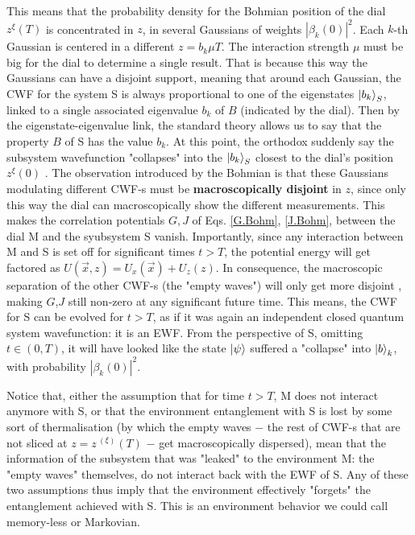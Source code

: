 \documentclass[11pt, a4paper]{article} %
\begin{document}
This means that the probability density for the Bohmian position of the dial $z^\xi(T)$ is concentrated in $z$, in several Gaussians of weights $|\beta_k(0)|^2$. Each $k$-th Gaussian is centered in a different $z=b_k \mu T$. The interaction strength $\mu$ must be big for the dial to determine a single result. That is because this way the Gaussians can have a disjoint support, meaning that around each Gaussian, the CWF for the system S is always proportional to one of the eigenstates $\ket{b_k}_S$, linked to a single associated eigenvalue $b_k$ of $B$ (indicated by the dial). Then by the eigenstate-eigenvalue link, the standard theory allows us to say that the property $B$ of S has the value $b_k$. At this point, the orthodox suddenly say the subsystem wavefunction "collapses" into the $\ket{b_k}_S$ closest to the dial's position $z^\xi(0)$ \cite{vonNeumann}. The observation introduced by the Bohmian is that these Gaussians modulating different CWF-s must be {\bf macroscopically disjoint} in $z$, since only this way the dial can macroscopically show the different measurements. This makes the correlation potentials $G,J$ of Eqs. \eqref{G.Bohm}, \eqref{J.Bohm}, between the dial M and the syubsystem S vanish. Importantly, since any interaction between M and S is set off for significant times $t>T$, the potential energy will get factored as $U(\vec{x},z)=U_x(\vec{x})+U_z(z)$. In consequence, the macroscopic separation of the other CWF-s (the "empty waves") will only get more disjoint \cite{Absolute}, making $G$,$J$ still non-zero at any significant future time. This means, the CWF for S can be evolved for $t>T$, as if it was again an independent closed quantum system wavefunction: it is an EWF. From the perspective of S, omitting $t\in(0,T)$, it will have looked like the state $\ket{\psi}$ suffered a "collapse" into $\ket{b}_k$, with probability $|\beta_k(0)|^2$.


Notice that, either the assumption that for time $t>T$, M does not interact anymore with S, or that the environment entanglement with S is lost by some sort of thermalisation (by which the empty waves $-$ the rest of CWF-s that are not sliced at $z=z^{\:(\xi)}(T)$ $-$ get macroscopically dispersed), mean that the information of the subsystem that was "leaked" to the environment M: the "empty waves" themselves, do not interact back with the EWF of S. Any of these two assumptions thus imply that the environment effectively "forgets" the entanglement achieved with S. This is an environment behavior we could call memory-less or Markovian.%
\end{document}

